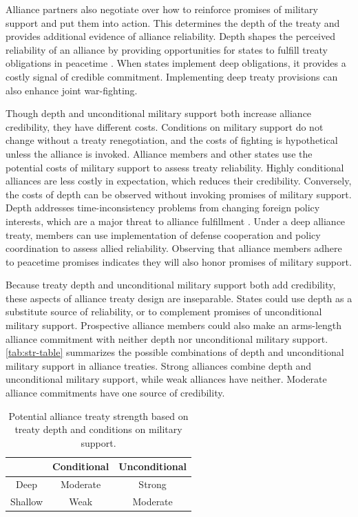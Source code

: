\documentclass[12pt]{article}
\begin{document}
Alliance partners also negotiate over how to reinforce promises of military support and put them into action. 
This determines the depth of the treaty and provides additional evidence of alliance reliability. 
Depth shapes the perceived reliability of an alliance by providing opportunities for states to fulfill treaty obligations in peacetime \citep{Morrow1994}. 
When states implement deep obligations, it provides a costly signal of credible commitment. 
Implementing deep treaty provisions can also enhance joint war-fighting. 


Though depth and unconditional military support both increase alliance credibility, they have different costs. 
Conditions on military support do not change without a treaty renegotiation, and the costs of fighting is hypothetical unless the alliance is invoked.  
Alliance members and other states use the potential costs of military support to assess treaty reliability. 
Highly conditional alliances are less costly in expectation, which reduces their credibility. 
Conversely, the costs of depth can be observed without invoking promises of military support. 
Depth addresses time-inconsistency problems from changing foreign policy interests, which are a major threat to alliance fulfillment \citep{LeedsSavun2007}. 
Under a deep alliance treaty, members can use implementation of defense cooperation and policy coordination to assess allied reliability. 
Observing that alliance members adhere to peacetime promises indicates they will also honor promises of military support. 


Because treaty depth and unconditional military support both add credibility, these aspects of alliance treaty design are inseparable. 
States could use depth as a substitute source of reliability, or to complement promises of unconditional military support. 
Prospective alliance members could also make an arms-length alliance commitment with neither depth nor unconditional military support. 
\autoref{tab:str-table} summarizes the possible combinations of depth and unconditional military support in alliance treaties. 
Strong alliances combine depth and unconditional military support, while weak alliances have neither. 
Moderate alliance commitments have one source of credibility. 


\begin{table}[hbt!]
\begin{center}
\caption{Potential alliance treaty strength based on treaty depth and conditions on military support.}
\begin{tabular}{ccc} 
                 & Conditional & Unconditional \\
\toprule
          Deep   &  Moderate & Strong \\
         Shallow & Weak      & Moderate \\
 \bottomrule
\end{tabular}
\label{tab:str-table}
\end{center} 
\end{table}
\end{document}
